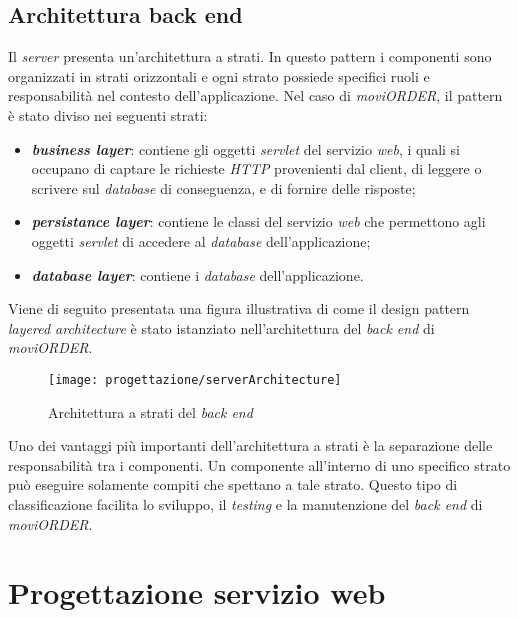 \subsection{Architettura back end}

Il \textit{server} presenta un'architettura a strati. In questo pattern i componenti sono organizzati in strati orizzontali e ogni strato possiede specifici ruoli e responsabilità nel contesto dell'applicazione. Nel caso di \textit{moviORDER}, il pattern è stato diviso nei seguenti strati:
\begin{itemize}
	\item \textbf{\textit{business layer}}: contiene gli oggetti \textit{servlet} del servizio \textit{web}, i quali si occupano di captare le richieste \textit{HTTP} provenienti dal client, di leggere o scrivere sul \textit{database} di conseguenza, e di fornire delle risposte;
	\item \textbf{\textit{persistance layer}}: contiene le classi del servizio \textit{web} che permettono agli oggetti \textit{servlet} di accedere al \textit{database} dell'applicazione;
	\item \textbf{\textit{database layer}}: contiene i \textit{database} dell'applicazione.
\end{itemize}

\newpage

Viene di seguito presentata una figura illustrativa di come il design pattern \textit{layered architecture} è stato istanziato nell'architettura del \textit{back end} di \textit{moviORDER}. 

\begin{figure}[!h] 
    \centering 
    \texttt{[image: progettazione/serverArchitecture]} 
    \caption{Architettura a strati del \textit{back end}}
\end{figure}

Uno dei vantaggi più importanti dell'architettura a strati è la separazione delle responsabilità tra i componenti. Un componente all'interno di uno specifico strato può eseguire solamente compiti che spettano a tale strato. Questo tipo di classificazione facilita lo sviluppo, il \textit{testing} e la manutenzione del \textit{back end} di \textit{moviORDER}.

\newpage

\section{Progettazione servizio web}

